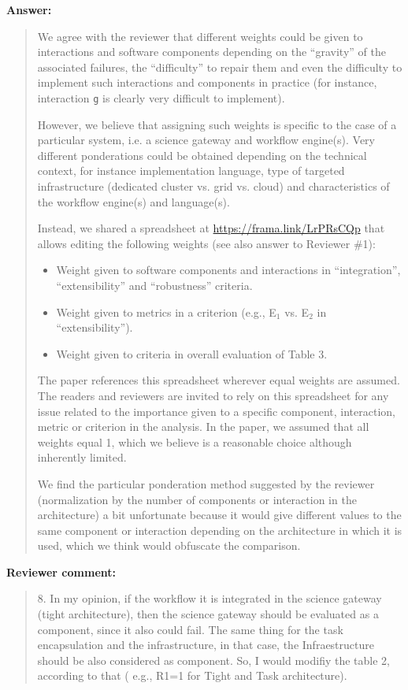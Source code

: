 \documentclass[a4]{article}
\newenvironment{review}%
{\textbf{Reviewer comment:}\begin{quote}}%
{\end{quote}}%
\newenvironment{answer}%
{\textbf{Answer:}\begin{small}\begin{quote}}%
{\end{quote}\end{small}}%
\begin{document}
\begin{answer}
  We agree with the reviewer that different weights could be given to
  interactions and software components depending on the ``gravity'' of
  the associated failures, the ``difficulty'' to repair them and even
  the difficulty to implement such interactions and components in
  practice (for instance, interaction \texttt{g} is clearly very
  difficult to implement).

  However, we believe that assigning such weights is specific to the
  case of a particular system, i.e. a science gateway and workflow
  engine(s). Very different ponderations could be obtained depending
  on the technical context, for instance implementation language, type
  of targeted infrastructure (dedicated cluster vs. grid vs. cloud)
  and characteristics of the workflow engine(s) and language(s).

  Instead, we shared a spreadsheet at
  \url{https://frama.link/LrPRsCQp} that allows editing the following
  weights (see also answer to Reviewer \#1):
  \begin{itemize}
  \item Weight given to software components and interactions in
  ``integration'', ``extensibility'' and ``robustness'' criteria.
  \item Weight given to metrics in a criterion (e.g., E$_1$ vs. E$_2$ in
  ``extensibility'').
  \item Weight given to criteria in overall evaluation of Table 3.
\end{itemize}
The paper references this spreadsheet wherever equal weights are
assumed. The readers and reviewers are invited to rely on this
spreadsheet for any issue related to the importance given to a
specific component, interaction, metric or criterion in the
analysis. In the paper, we assumed that all weights equal 1, which we
believe is a reasonable choice although inherently limited.

We find the particular ponderation method suggested by the reviewer
(normalization by the number of components or interaction in the
architecture) a bit unfortunate because it would give different
values to the same component or interaction depending on the
architecture in which it is used, which we think would obfuscate the
comparison.
\end{answer}

\begin{review}
8. In my opinion, if the workflow it is integrated in the science
gateway (tight architecture), then the science gateway should be
evaluated as a component, since it also could fail. The same thing for
the task encapsulation and the infrastructure, in that case, the
Infraestructure should be also considered as component. So, I would
modifiy the table 2, according to that ( e.g., R1=1 for Tight and Task
architecture).
\end{review}
\end{document}
